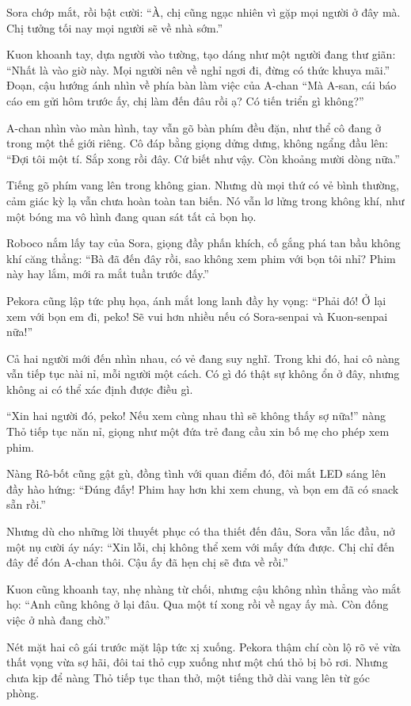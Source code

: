 \documentclass[../main.tex]{subfiles}
\begin{document}
Sora chớp mắt, rồi bật cười: ``À, chị cũng ngạc nhiên vì gặp mọi người ở đây mà. Chị tưởng tối nay mọi người sẽ về nhà sớm.''

Kuon khoanh tay, dựa người vào tường, tạo dáng như một người đang thư giãn: ``Nhất là vào giờ này. Mọi người nên về nghỉ ngơi đi, đừng có thức khuya mãi.'' Đoạn, cậu hướng ánh nhìn về phía bàn làm việc của A-chan ``Mà A-san, cái báo cáo em gửi hôm trước ấy, chị làm đến đâu rồi ạ? Có tiến triển gì không?''

A-chan nhìn vào màn hình, tay vẫn gõ bàn phím đều đặn, như thể cô đang ở trong một thế giới riêng. Cô đáp bằng giọng dửng dưng, không ngẩng đầu lên: ``Đợi tôi một tí. Sắp xong rồi đây. Cứ biết như vậy. Còn khoảng mười dòng nữa.''

Tiếng gõ phím vang lên trong không gian. Nhưng dù mọi thứ có vẻ bình thường, cảm giác kỳ lạ vẫn chưa hoàn toàn tan biến. Nó vẫn lơ lửng trong không khí, như một bóng ma vô hình đang quan sát tất cả bọn họ.

Roboco nắm lấy tay của Sora, giọng đầy phấn khích, cố gắng phá tan bầu không khí căng thẳng: ``Bà đã đến đây rồi, sao không xem phim với bọn tôi nhỉ? Phim này hay lắm, mới ra mắt tuần trước đấy.''

Pekora cũng lập tức phụ họa, ánh mắt long lanh đầy hy vọng: ``Phải đó! Ở lại xem với bọn em đi, peko! Sẽ vui hơn nhiều nếu có Sora-senpai và Kuon-senpai nữa!''

Cả hai người mới đến nhìn nhau, có vẻ đang suy nghĩ. Trong khi đó, hai cô nàng vẫn tiếp tục nài nỉ, mỗi người một cách. Có gì đó thật sự không ổn ở đây, nhưng không ai có thể xác định được điều gì.

``Xin hai người đó, peko! Nếu xem cùng nhau thì sẽ không thấy sợ nữa!'' nàng Thỏ tiếp tục năn nỉ, giọng như một đứa trẻ đang cầu xin bố mẹ cho phép xem phim.

Nàng Rô-bốt cũng gật gù, đồng tình với quan điểm đó, đôi mắt LED sáng lên đầy hào hứng: ``Đúng đấy! Phim hay hơn khi xem chung, và bọn em đã có snack sẵn rồi.''

Nhưng dù cho những lời thuyết phục có tha thiết đến đâu, Sora vẫn lắc đầu, nở một nụ cười áy náy: ``Xin lỗi, chị không thể xem với mấy đứa được. Chị chỉ đến đây để đón A-chan thôi. Cậu ấy đã hẹn chị sẽ đưa về rồi.''

Kuon cũng khoanh tay, nhẹ nhàng từ chối, nhưng cậu không nhìn thẳng vào mắt họ: ``Anh cũng không ở lại đâu. Qua một tí xong rồi về ngay ấy mà. Còn đống việc ở nhà đang chờ.''

Nét mặt hai cô gái trước mặt lập tức xị xuống. Pekora thậm chí còn lộ rõ vẻ vừa thất vọng vừa sợ hãi, đôi tai thỏ cụp xuống như một chú thỏ bị bỏ rơi. Nhưng chưa kịp để nàng Thỏ tiếp tục than thở, một tiếng thở dài vang lên từ góc phòng.
\end{document}
